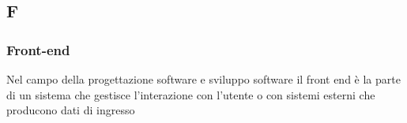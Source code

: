\subsection*{\textbf{\hfill \Huge{F} \hfill}} 
\subsubsection*{Front-end}
Nel campo della progettazione software e sviluppo software il front end è la parte di un sistema che gestisce l'interazione con l'utente o con sistemi esterni che producono dati di ingresso